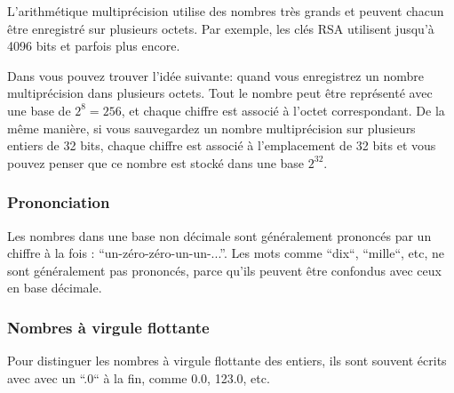 L'arithmétique multiprécision utilise des nombres très grands et peuvent chacun être enregistré sur plusieurs octets.
Par exemple, les clés RSA utilisent jusqu'à 4096 bits et parfois plus encore.

Dans  vous pouvez trouver l'idée suivante: quand vous enregistrez un nombre multiprécision dans plusieurs octets. Tout le nombre peut être représenté avec une base de $2^8=256$, et chaque chiffre est associé à l'octet correspondant.
De la même manière, si vous sauvegardez un nombre multiprécision sur plusieurs entiers de 32 bits, chaque chiffre est associé à l'emplacement de 32 bits et vous pouvez penser que ce nombre est stocké dans une base $2^{32}$.

\subsubsection{Prononciation}

Les nombres dans une base non décimale sont généralement prononcés par un chiffre à la fois : ``un-zéro-zéro-un-un-...''.
Les mots comme ``dix``, ``mille``, etc, ne sont généralement pas prononcés, parce qu'ils peuvent être confondus avec ceux en base décimale.

\subsubsection{Nombres à virgule flottante}

Pour distinguer les nombres à virgule flottante des entiers, ils sont souvent écrits avec avec un ``.0`` à la fin,
comme 0.0, 123.0, etc.
